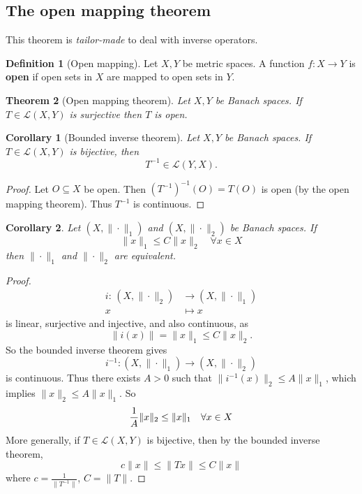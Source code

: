 \documentclass[10pt, oneside, reqno]{amsart}
\theoremstyle{plain}%
\newtheorem{thm}{Theorem}[section]
\newtheorem*{cor}{Corollary}
\theoremstyle{definition}
\newtheorem{defn}[thm]{Definition}
\theoremstyle{remark}
\newcommand{\mapping}[5]{\begin{align*}
    #1 : \,     #2 &\rightarrow #3 \\
            #4  &\mapsto #5
\end{align*}    
}
\begin{document}
\subsection{The open mapping theorem} %
\label{sub:the_open_mapping_theorem}
This theorem is \emph{tailor-made} to deal with inverse operators.

\begin{defn}[Open mapping]
    Let $X, Y$ be metric spaces.  A function $f : X \rightarrow Y$ is \textbf{open} if open sets in $X$ are mapped to open sets in $Y$.  
\end{defn}

\begin{thm}[Open mapping theorem]
    Let $X, Y$ be Banach spaces.  If $T \in \mathcal{L}(X,Y)$ is surjective then $T$ is open. 
\end{thm}

\begin{cor}[Bounded inverse theorem]
    Let $X, Y$ be Banach spaces.  If $T \in \mathcal L(X,Y)$ is bijective, then \[
        T^{-1} \in \mathcal L(Y,X).
    \]
    
\end{cor}
\begin{proof}
    Let $O \subseteq X$ be open.  Then $(T^{-1})^{-1}(O) = T(O)$ is open (by the open mapping theorem).  Thus $T^{-1}$ is continuous.
\end{proof}

\begin{cor}
    Let $(X, \| \cdot \|_1)$ and $(X, \| \cdot \|_2)$ be Banach spaces.  If \[
        \| x \|_1 \leq C \| x \|_2 \quad \forall x \in X
    \] then $\| \cdot \|_1$ and $\| \cdot \|_2$ are equivalent.  
\end{cor}
\begin{proof}
    \mapping{i}{(X, \| \cdot \|_2)}{(X, \| \cdot \|_1)}{ x}{x} is linear, surjective and injective, and also continuous, as \[
        \|i(x) \| = \| x \|_1 \leq C \| x \|_2.
    \]  So the bounded inverse theorem gives \[
        i^{-1} : (X, \| \cdot \|_1) \rightarrow (X, \| \cdot \|_2)
    \] is continuous.  Thus there exists $A > 0$ such that $\| i^{-1}(x)\|_2 \leq A \| x \|_1$, which implies $\| x \|_2 \leq A \| x \|_1$.  So \[
        \frac{1}{A} \| x \|_2 \leq \| x \|_1 \quad \forall x \in X \qedhere
    \]  More generally, if $T \in \mathcal L(X,Y)$ is bijective, then by the bounded inverse theorem, \[
        c \| x \| \leq \| Tx \| \leq C \| x \|
    \] where $c  = \frac{1}{ \| T^{-1} \|}$, $C = \| T \|$.  
\end{proof} 
\end{document}
